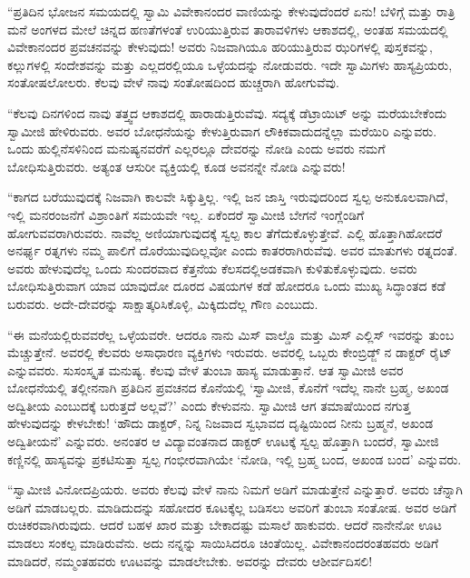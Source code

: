  “ಪ್ರತಿದಿನ ಭೋಜನ ಸಮಯದಲ್ಲಿ ಸ್ವಾಮಿ ವಿವೇಕಾನಂದರ ವಾಣಿಯನ್ನು ಕೇಳುವುದೆಂದರೆ ಏನು! ಬೆಳಿಗ್ಗೆ ಮತ್ತು ರಾತ್ರಿ ಮನೆ ಅಂಗಳದ ಮೇಲೆ ಚಿನ್ನದ ಹಣತೆಗಳಂತೆ ಉರಿಯುತ್ತಿರುವ ತಾರಾವಳಿಗಳು ಆಕಾಶದಲ್ಲಿ, ಅಂತಹ ಸಮಯದಲ್ಲಿ ವಿವೇಕಾನಂದರ ಪ್ರವಚನವನ್ನು ಕೇಳುವುದು! ಅವರು ನಿಜವಾಗಿಯೂ ಹರಿಯುತ್ತಿರುವ ಝರಿಗಳಲ್ಲಿ ಪುಸ್ತಕವನ್ನು, ಕಲ್ಲುಗಳಲ್ಲಿ ಸಂದೇಶವನ್ನು ಮತ್ತು ಎಲ್ಲದರಲ್ಲಿಯೂ ಒಳ್ಳೆಯದನ್ನು ನೋಡುವರು. ಇದೇ ಸ್ವಾಮಿಗಳು ಹಾಸ್ಯಪ್ರಿಯರು, ಸಂತೋಷಲೋಲರು. ಕೆಲವು ವೇಳೆ ನಾವು ಸಂತೋಷದಿಂದ ಹುಚ್ಚರಾಗಿ ಹೋಗುವೆವು.

 “ಕೆಲವು ದಿನಗಳಿಂದ ನಾವು ತತ್ತ್ವದ ಆಕಾಶದಲ್ಲಿ ಹಾರಾಡುತ್ತಿರುವೆವು. ಸದ್ಯಕ್ಕೆ ಡೆಟ್ರಾಯಿಟ್ ಅನ್ನು ಮರೆಯಬೇಕೆಂದು ಸ್ವಾಮೀಜಿ ಹೇಳಿರುವರು. ಅವರ ಬೋಧನೆಯನ್ನು ಕೇಳುತ್ತಿರುವಾಗ ಲೌಕಿಕವಾದುದನ್ನೆಲ್ಲಾ ಮರೆಯಿರಿ ಎನ್ನುವರು. ಒಂದು ಹುಲ್ಲಿನೆಸಳಿನಿಂದ ಮನುಷ್ಯನವರೆಗೆ ಎಲ್ಲರಲ್ಲೂ ದೇವರನ್ನು ನೋಡಿ ಎಂದು ಅವರು ನಮಗೆ ಬೋಧಿಸುತ್ತಿರುವರು. ಅತ್ಯಂತ ಆಸುರೀ ವ್ಯಕ್ತಿಯಲ್ಲಿ ಕೂಡ ಅವನನ್ನೇ ನೋಡಿ ಎನ್ನುವರು!

 “ಕಾಗದ ಬರೆಯುವುದಕ್ಕೆ ನಿಜವಾಗಿ ಕಾಲವೇ ಸಿಕ್ಕುತ್ತಿಲ್ಲ. ಇಲ್ಲಿ ಜನ ಜಾಸ್ತಿ ಇರುವುದರಿಂದ ಸ್ವಲ್ಪ ಅನುಕೂಲವಾಗಿದೆ, ಇಲ್ಲಿ ಮನರಂಜನೆಗೆ ವಿಶ್ರಾಂತಿಗೆ ಸಮಯವೇ ಇಲ್ಲ. ಏಕೆಂದರೆ ಸ್ವಾಮೀಜಿ ಬೇಗನೆ ಇಂಗ್ಲೆಂಡಿಗೆ ಹೋಗುವವರಾಗಿರುವರು. ನಾವೆಲ್ಲ ಅಣಿಯಾಗುವುದಕ್ಕೆ ಸ್ವಲ್ಪ ಕಾಲ ತೆಗೆದುಕೊಳ್ಳುತ್ತೇವೆ. ಎಲ್ಲಿ ಹೊತ್ತಾಗಿಹೋದರೆ ಅನರ್ಘ್ಯ ರತ್ನಗಳು ನಮ್ಮ ಪಾಲಿಗೆ ದೊರೆಯುವುದಿಲ್ಲವೋ ಎಂದು ಕಾತರರಾಗಿರುವೆವು. ಅವರ ಮಾತುಗಳು ರತ್ನದಂತೆ. ಅವರು ಹೇಳುವುದೆಲ್ಲ ಒಂದು ಸುಂದರವಾದ ಕೆತ್ತನೆಯ ಕೆಲಸದಲ್ಲಿ\break ಅಡಕವಾಗಿ ಕುಳಿತುಕೊಳ್ಳುವುದು. ಅವರು ಬೋಧಿಸುತ್ತಿರುವಾಗ ಯಾವ ಯಾವುದೋ ದೂರದ ವಿಷಯಗಳ ಕಡೆ ಹೋದರೂ ಒಂದು ಮುಖ್ಯ ಸಿದ್ಧಾಂತದ ಕಡೆ ಬರುವರು. ಅದೇ-ದೇವರನ್ನು ಸಾಕ್ಷಾತ್ಕರಿಸಿಕೊಳ್ಳಿ, ಮಿಕ್ಕಿದುದೆಲ್ಲ ಗೌಣ ಎಂಬುದು.

 “ಈ ಮನೆಯಲ್ಲಿರುವವರೆಲ್ಲ ಒಳ್ಳೆಯವರೇ. ಆದರೂ ನಾನು ಮಿಸ್ ವಾಲ್ಡೊ ಮತ್ತು ಮಿಸ್ ಎಲ್ಲಿಸ್ ಇವರನ್ನು ತುಂಬ ಮೆಚ್ಚುತ್ತೇನೆ. ಅವರಲ್ಲಿ ಕೆಲವರು ಅಸಾಧಾರಣ ವ್ಯಕ್ತಿಗಳು ಇರುವರು. ಅವರಲ್ಲಿ ಒಬ್ಬರು ಕೇಂಬ್ರಿಡ್ಜ್ ನ ಡಾಕ್ಟರ್ ರೈಟ್ ಎನ್ನುವವರು. ಸುಸಂಸ್ಕೃತ ಮನುಷ್ಯ. ಕೆಲವು ವೇಳೆ ತುಂಬಾ ಹಾಸ್ಯ ಮಾಡುತ್ತಾನೆ. ಆತ ಸ್ವಾಮೀಜಿ ಅವರ ಬೋಧನೆಯಲ್ಲಿ ತಲ್ಲೀನನಾಗಿ ಪ್ರತಿದಿನ ಪ್ರವಚನದ ಕೊನೆಯಲ್ಲಿ ‘ಸ್ವಾಮೀಜಿ, ಕೊನೆಗೆ ಇದೆಲ್ಲ ನಾನೇ ಬ್ರಹ್ಮ, ಅಖಂಡ ಅದ್ವಿತೀಯ ಎಂಬುದಕ್ಕೆ ಬರುತ್ತದೆ ಅಲ್ಲವೆ?’ ಎಂದು ಕೇಳುವನು. ಸ್ವಾಮೀಜಿ ಆಗ ತಮಾಷೆಯಿಂದ ನಗುತ್ತ ಹೇಳುವುದನ್ನು ಕೇಳಬೇಕು! ‘ಹೌದು ಡಾಕ್ಟರ್, ನಿನ್ನ ನಿಜವಾದ ಸ್ವಭಾವದ ದೃಷ್ಟಿಯಿಂದ ನೀನು ಬ್ರಹ್ಮನೆ, ಅಖಂಡ ಅದ್ವಿತೀಯನೆ’ ಎನ್ನುವರು. ಅನಂತರ ಆ ವಿದ್ಯಾವಂತನಾದ ಡಾಕ್ಟರ್ ಊಟಕ್ಕೆ ಸ್ವಲ್ಪ ಹೊತ್ತಾಗಿ ಬಂದರೆ, ಸ್ವಾಮೀಜಿ ಕಣ್ಣಿನಲ್ಲಿ ಹಾಸ್ಯವನ್ನು ಪ್ರಕಟಿಸುತ್ತಾ ಸ್ವಲ್ಪ ಗಂಭೀರವಾಗಿಯೇ ‘ನೋಡಿ, ಇಲ್ಲಿ ಬ್ರಹ್ಮ ಬಂದ, ಅಖಂಡ ಬಂದ’ ಎನ್ನುವರು. 

 “ಸ್ವಾಮೀಜಿ ವಿನೋದಪ್ರಿಯರು. ಅವರು ಕೆಲವು ವೇಳೆ ನಾನು ನಿಮಗೆ ಅಡಿಗೆ ಮಾಡುತ್ತೇನೆ ಎನ್ನುತ್ತಾರೆ. ಅವರು ಚೆನ್ನಾಗಿ ಅಡಿಗೆ ಮಾಡಬಲ್ಲರು. ಮಾಡಿದುದನ್ನು ಸಹೋದರ ಕೂಟಕ್ಕೆಲ್ಲ ಬಡಿಸಲು ಅವರಿಗೆ ತುಂಬಾ ಸಂತೋಷ. ಅವರ ಅಡಿಗೆ ರುಚಿಕರವಾಗಿರುವುದು. ಆದರೆ ಬಹಳ ಖಾರ ಮತ್ತು ಬೇಕಾದಷ್ಟು ಮಸಾಲೆ ಹಾಕುವರು. ಆದರೆ ನಾನೇನೋ ಊಟ ಮಾಡಲು ಸಂಕಲ್ಪ ಮಾಡಿರುವೆನು. ಅದು ನನ್ನನ್ನು ಸಾಯಿಸಿದರೂ ಚಿಂತೆಯಿಲ್ಲ. ವಿವೇಕಾನಂದರಂತಹವರು ಅಡಿಗೆ ಮಾಡಿದರೆ, ನಮ್ಮಂತಹವರು ಊಟವನ್ನು ಮಾಡಲೇಬೇಕು. ಅವರನ್ನು ದೇವರು ಆಶೀರ್ವದಿಸಲಿ!

